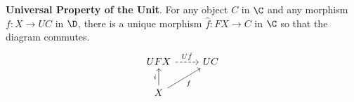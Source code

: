 



\bigskip
\noindent\textbf{Universal Property of the Unit}. For any object $C$ in $\C$ and any morphism $f\colon X\to UC$ in $\D$, there is a unique morphism $\hat f\colon FX\to C$ in $\C$ so that the diagram commutes.
\[
  \begin{tikzcd}
  UFX \arrow[r, dashed, "U\hat f"]       & UC \\
  X \arrow[ru, "f"'] \arrow[u, "i"] &   
  \end{tikzcd}
\]

